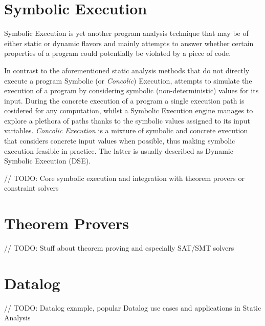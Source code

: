 \section{Symbolic Execution}

Symbolic Execution is yet another program analysis technique that
may be of either static or dynamic flavors and mainly attempts
to answer whether certain properties of a program could potentially
be violated by a piece of code\cite{baldoni2018survey}.

In contrast to the aforementioned static analysis methods that
do not directly execute a program Symbolic (or \textit{Concolic}) Execution,
attempts to simulate the execution of a
program by considering symbolic (non-deterministic) values for its input.
During the concrete execution of a program a single execution path is
cosidered for any computation, whilst a Symbolic Execution engine manages
to explore a plethora of paths thanks to the symbolic values assigned to
its input variables. \textit{Concolic Execution} is a mixture of symbolic and concrete
execution that considers concrete input values when possible, thus making
symbolic execution feasible in practice. The latter is usually described
as Dynamic Symbolic Execution (DSE).


// TODO: Core symbolic execution and integration with theorem provers or constraint solvers

\section{Theorem Provers}

// TODO: Stuff about theorem proving and especially SAT/SMT solvers

\section{Datalog}

// TODO: Datalog example, popular Datalog use cases and applications in Static Analysis

